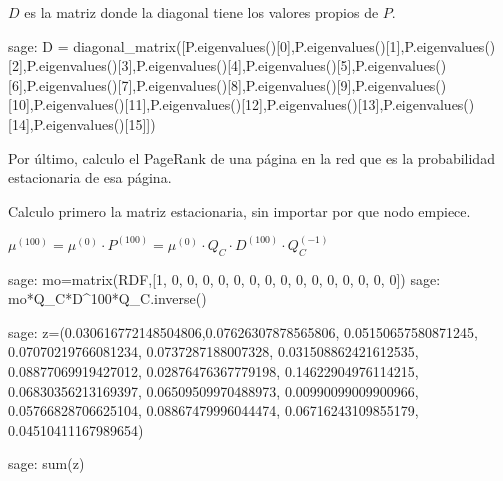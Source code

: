 \par $D$ es la matriz donde la diagonal tiene los valores propios de $P$.
\begin{sagecommandline}
    sage: D = diagonal_matrix([P.eigenvalues()[0],P.eigenvalues()[1],P.eigenvalues()[2],P.eigenvalues()[3],P.eigenvalues()[4],P.eigenvalues()[5],P.eigenvalues()[6],P.eigenvalues()[7],P.eigenvalues()[8],P.eigenvalues()[9],P.eigenvalues()[10],P.eigenvalues()[11],P.eigenvalues()[12],P.eigenvalues()[13],P.eigenvalues()[14],P.eigenvalues()[15]])
\end{sagecommandline}

\par Por último, calculo el PageRank de una página en la red que es la probabilidad estacionaria de esa página.
\par Calculo primero la matriz estacionaria, sin importar por que nodo empiece.
\par $\mu^(100) = \mu^(0) \cdot P^(100) = \mu^(0) \cdot Q_C \cdot D^(100) \cdot Q_C^(-1)$
\begin{sagecommandline}
    sage: mo=matrix(RDF,[1, 0, 0, 0, 0, 0, 0, 0, 0, 0, 0, 0, 0, 0, 0, 0])
    sage: mo*Q_C*D^100*Q_C.inverse()
\end{sagecommandline}

\begin{sagecommandline}
    sage: z=(0.030616772148504806,0.07626307878565806, 0.05150657580871245, 0.07070219766081234, 0.0737287188007328, 0.031508862421612535, 0.08877069919427012, 0.02876476367779198, 0.14622904976114215, 0.06830356213169397, 0.06509509970488973, 0.00990099009900966, 0.05766828706625104, 0.08867479996044474, 0.06716243109855179, 0.04510411167989654)
\end{sagecommandline}

\begin{sagecommandline}
    sage: sum(z)
\end{sagecommandline}

